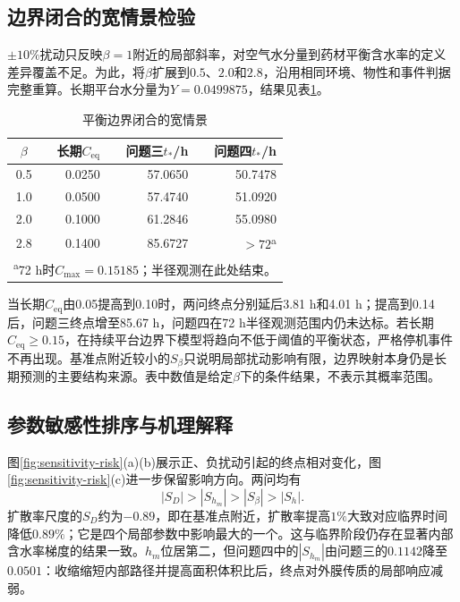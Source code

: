 \subsection{边界闭合的宽情景检验}

$\pm10\%$扰动只反映$\beta=1$附近的局部斜率，对空气水分量到药材平衡含水率的定义差异覆盖不足。为此，将$\beta$扩展到$0.5$、$2.0$和$2.8$，沿用相同环境、物性和事件判据完整重算。长期平台水分量为$Y=0.0499875$，结果见表\ref{tab:boundary-closure-scenarios}。

\begin{table}[htbp]
  \caption{平衡边界闭合的宽情景}
  \label{tab:boundary-closure-scenarios}
  \centering
  \begin{tabular}{crrr}
    \toprule
    $\beta$ & 长期$C_{\mathrm{eq}}$ & 问题三$t_*$/h & 问题四$t_*$/h \\
    \midrule
    0.5 & 0.0250 & 57.0650 & 50.7478 \\
    1.0 & 0.0500 & 57.4740 & 51.0920 \\
    2.0 & 0.1000 & 61.2846 & 55.0980 \\
    2.8 & 0.1400 & 85.6727 & $>72$\textsuperscript{a} \\
    \bottomrule
    \multicolumn{4}{l}{\footnotesize \textsuperscript{a}72 h时$C_{\max}=0.15185$；半径观测在此处结束。} \\
  \end{tabular}
\end{table}

当长期$C_{\mathrm{eq}}$由0.05提高到0.10时，两问终点分别延后3.81 h和4.01 h；提高到0.14后，问题三终点增至85.67 h，问题四在72 h半径观测范围内仍未达标。若长期$C_{\mathrm{eq}}\ge0.15$，在持续平台边界下模型将趋向不低于阈值的平衡状态，严格停机事件不再出现。基准点附近较小的$S_\beta$只说明局部扰动影响有限，边界映射本身仍是长期预测的主要结构来源。表中数值是给定$\beta$下的条件结果，不表示其概率范围。

\subsection{参数敏感性排序与机理解释}

图\ref{fig:sensitivity-risk}(a)(b)展示正、负扰动引起的终点相对变化，图\ref{fig:sensitivity-risk}(c)进一步保留影响方向。两问均有
\begin{equation}
|S_D|>|S_{h_m}|>|S_{\beta}|>|S_h|.
\end{equation}
扩散率尺度的$S_D$约为$-0.89$，即在基准点附近，扩散率提高$1\%$大致对应临界时间降低$0.89\%$；它是四个局部参数中影响最大的一个。这与临界阶段仍存在显著内部含水率梯度的结果一致。$h_m$位居第二，但问题四中的$|S_{h_m}|$由问题三的$0.1142$降至$0.0501$：收缩缩短内部路径并提高面积体积比后，终点对外膜传质的局部响应减弱。

